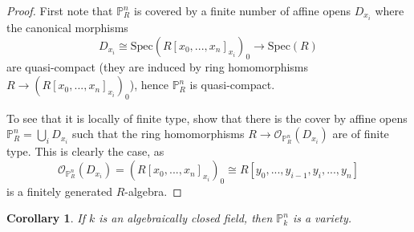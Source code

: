 \documentclass{scrartcl}
\renewcommand{\P}{\mathbb{P}}
\newcommand{\Spec}{\mathrm{Spec}}
\renewcommand{\O}{\mathcal{O}}
\newtheorem{corollary}[prop]{Corollary}
\theoremstyle{definition}
\begin{document}
\begin{proof}
    First note that $\P_R^n$ is covered by a finite number of affine opens $D_{x_i}$ where the canonical morphisms
    \begin{equation*}
        D_{x_i} \cong \Spec(R[x_0, ..., x_n]_{x_i})_0 \to \Spec(R)
    \end{equation*}
    are quasi-compact (they are induced by ring homomorphisms $R \to (R[x_0, ..., x_n]_{x_i})_0$), hence $\P_R^n$ is quasi-compact.

    To see that it is locally of finite type, show that there is the cover by affine opens $\P_R^n = \bigcup_i D_{x_i}$ such that the ring homomorphisms $R \to \O_{\P_R^n}(D_{x_i})$ are of finite type.
    This is clearly the case, as
    \begin{equation*}
        \O_{\P_R^n}(D_{x_i}) = (R[x_0, ..., x_n]_{x_i})_0 \cong R[y_0, ..., y_{i - 1}, y_i, ..., y_n]
    \end{equation*}
    is a finitely generated $R$-algebra.
\end{proof}
\begin{corollary}
    If $k$ is an algebraically closed field, then $\P_k^n$ is a variety.
\end{corollary}
\end{document}
